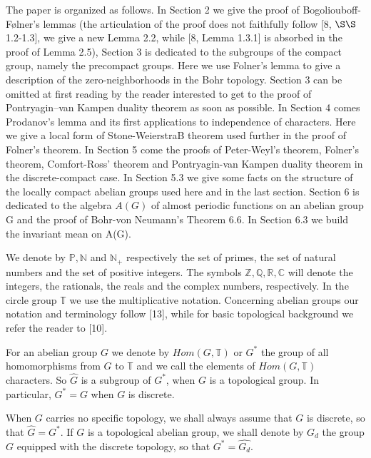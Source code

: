 \documentclass[12pt]{article}
\begin{document}
    The paper is organized as follows. In Section 2 we give the proof of Bogoliouboff-Følner's lemmas (the articulation of
    the proof does not faithfully follow [8, $\S\S$1.2-1.3], we give a new Lemma 2.2, while [8, Lemma 1.3.1] is absorbed in the
    proof of Lemma 2.5), Section 3 is dedicated to the subgroups of the compact group, namely the precompact groups. Here
    we use Folner's lemma to give a description of the zero-neighborhoods in the Bohr topology. Section 3 can be omitted at
    first reading by the reader interested to get to the proof of Pontryagin–van Kampen duality theorem as soon as possible.
    In Section 4 comes Prodanov's lemma and its first applications to independence of characters. Here we give a local form
    of Stone-WeierstraB theorem used further in the proof of Folner's theorem. In Section 5 come the proofs of Peter-Weyl's
    theorem, Folner's theorem, Comfort-Ross' theorem and Pontryagin-van Kampen duality theorem in the discrete-compact
    case. In Section 5.3 we give some facts on the structure of the locally compact abelian groups used here and in the last
    section. Section 6 is dedicated to the algebra $A(G)$ of almost periodic functions on an abelian group G and the proof of
    Bohr-von Neumann's Theorem 6.6. In Section 6.3 we build the invariant mean on A(G).


        We denote by $\mathbb{P}, \mathbb{N}$ and $\mathbb{N}_+$ respectively the set of primes, the set of natural numbers and the set of positive integers.
    The symbols $\mathbb{Z}, \mathbb{Q}, \mathbb{R}, \mathbb{C}$ will denote the integers, the rationals, the reals and the complex numbers, respectively. In the circle
    group $\mathbb{T}$ we use the multiplicative notation. Concerning abelian groups our notation and terminology follow [13], while for
    basic topological background we refer the reader to [10].


        For an abelian group $G$ we denote by $Hom(G,\mathbb{T})$ or $G^*$ the group of all homomorphisms from $G$ to $\mathbb{T}$ and we call the
    elements of $Hom(G,\mathbb{T})$ characters. So $\widehat{G}$ is a subgroup of $G^*$, when $G$ is a topological group. In particular, $G^* = G$ when $G$
    is discrete.


    When $G$ carries no specific topology, we shall always assume that $G$ is discrete, so that $\widehat{G} = G^*$. If $G$ is a topological
    abelian group, we shall denote by $G_d$ the group $G$ equipped with the discrete topology, so that $G^* = \widehat{G_d}$.
    
\end{document}
